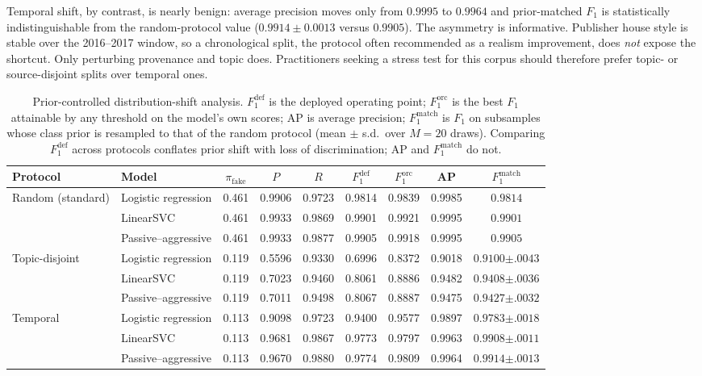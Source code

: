 \documentclass[conference]{IEEEtran}
\newcommand{\Fone}{$F_1$}
\begin{document}
Temporal shift, by contrast, is nearly benign: average precision moves only
from $0.9995$ to $0.9964$ and prior-matched \Fone{} is statistically
indistinguishable from the random-protocol value
($0.9914 \pm 0.0013$ versus $0.9905$). The asymmetry is informative. Publisher
house style is stable over the 2016--2017 window, so a chronological split, the
protocol often recommended as a realism improvement, does \emph{not} expose
the shortcut. Only perturbing provenance and topic does. Practitioners seeking a
stress test for this corpus should therefore prefer topic- or source-disjoint
splits over temporal ones.

\begin{table}[t]
\centering
\caption{Prior-controlled distribution-shift analysis. $F_1^{\text{def}}$ is
the deployed operating point; $F_1^{\text{orc}}$ is the best \Fone{} attainable
by any threshold on the model's own scores; AP is average precision;
$F_1^{\text{match}}$ is \Fone{} on subsamples whose class prior is resampled to
that of the random protocol (mean $\pm$ s.d.\ over $M{=}20$ draws). Comparing
$F_1^{\text{def}}$ across protocols conflates prior shift with loss of
discrimination; AP and $F_1^{\text{match}}$ do not.}
\label{tab:shift}
\footnotesize
\begin{tabular}{@{}llccccccc@{}}
\toprule
Protocol & Model & $\pi_{\text{fake}}$ & $P$ & $R$ &
$F_1^{\text{def}}$ & $F_1^{\text{orc}}$ & AP & $F_1^{\text{match}}$\\
\midrule
\multirow{3}{*}{Random (standard)}
 & Logistic regression & 0.461 & 0.9906 & 0.9723 & 0.9814 & 0.9839 & 0.9985 & $0.9814$\\
 & LinearSVC           & 0.461 & 0.9933 & 0.9869 & 0.9901 & 0.9921 & 0.9995 & $0.9901$\\
 & Passive--aggressive & 0.461 & 0.9933 & 0.9877 & 0.9905 & 0.9918 & 0.9995 & $0.9905$\\
\midrule
\multirow{3}{*}{Topic-disjoint}
 & Logistic regression & 0.119 & 0.5596 & 0.9330 & 0.6996 & 0.8372 & 0.9018 & $0.9100${\scriptsize$\pm.0043$}\\
 & LinearSVC           & 0.119 & 0.7023 & 0.9460 & 0.8061 & 0.8886 & 0.9482 & $0.9408${\scriptsize$\pm.0036$}\\
 & Passive--aggressive & 0.119 & 0.7011 & 0.9498 & 0.8067 & 0.8887 & 0.9475 & $0.9427${\scriptsize$\pm.0032$}\\
\midrule
\multirow{3}{*}{Temporal}
 & Logistic regression & 0.113 & 0.9098 & 0.9723 & 0.9400 & 0.9577 & 0.9897 & $0.9783${\scriptsize$\pm.0018$}\\
 & LinearSVC           & 0.113 & 0.9681 & 0.9867 & 0.9773 & 0.9797 & 0.9963 & $0.9908${\scriptsize$\pm.0011$}\\
 & Passive--aggressive & 0.113 & 0.9670 & 0.9880 & 0.9774 & 0.9809 & 0.9964 & $0.9914${\scriptsize$\pm.0013$}\\
\bottomrule
\end{tabular}
\end{table}
\end{document}
